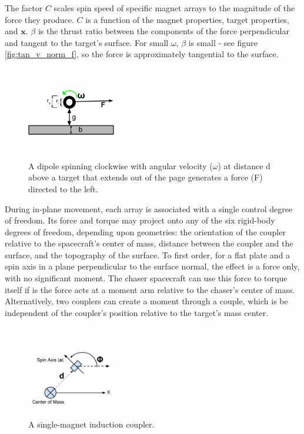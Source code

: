 The factor $C$ scales spin speed of specific magnet arrays to the magnitude of the force they produce. $C$ is a function of the magnet properties, target properties, and $\boldsymbol{x}$. $\beta$ is the thrust ratio between the components of the force perpendicular and tangent to the target's surface. For small $\omega$, $\beta$ is small - see figure \ref{fig:tan_v_norm_f}, so the force is approximately tangential to the surface.

\begin{figure}
\includegraphics[width = 4cm, height = 4cm ]{figures/force_diagram.png}

\caption{A dipole spinning clockwise with angular velocity ($\omega$) at distance d above a target that extends out of the page generates a force (F) directed to the left.}
\label{fig:arry_force_diagram}
\end{figure}

During in-plane movement, each array is associated with a single control degree of freedom. Its force and torque may project onto any of the six rigid-body degrees of freedom, depending upon geometries: the orientation of the coupler relative to the spacecraft's center of mass, distance between the coupler and the surface, and the topography of the surface. To first order, for a flat plate and a spin axis in a plane perpendicular to the surface normal, the effect is a force only, with no significant moment. The chaser spacecraft can use this force to torque itself if is the force acts at a moment arm relative to the chaser's center of mass. Alternatively, two couplers can create a moment through a couple, which is be independent of the coupler's position relative to the target's mass center.


\begin{figure}
\includegraphics[width = 4cm, height = 4cm ]{figures/minimum_array.png}

\caption{A single-magnet induction coupler.}
\label{fig:min_array_diagram}
\end{figure}

